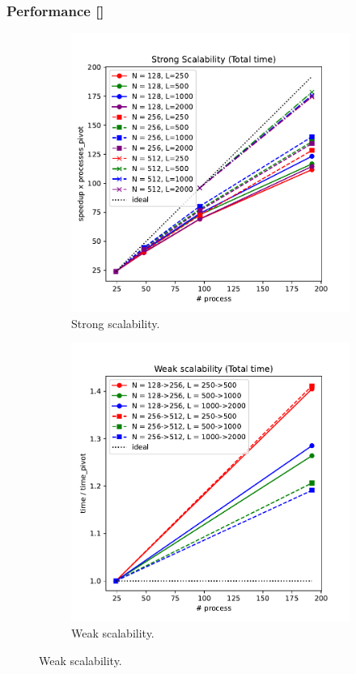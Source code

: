 \documentclass{beamer}
\makeatletter
\newcommand{\mylabel}{%
   [\beamer@againname]}
\makeatother
\begin{document}
\begin{frame}[label=performancescaling]
 \frametitle{Performance\mylabel}
  \vspace*{-.5cm}
  \begin{figure}
      \begin{subfigure}[b]{.49\textwidth}
      \includegraphics[width=\textwidth]{images/appendix/strong-scale-Total.pdf}%
      \caption{Strong scalability.}
      \end{subfigure}
      \begin{subfigure}[b]{.49\textwidth}
      \includegraphics[width=\textwidth]{images/appendix/weak-scale-Total.pdf}%
      \caption{Weak scalability.}
      \end{subfigure}
  \end{figure}
\end{frame}
\end{document}
